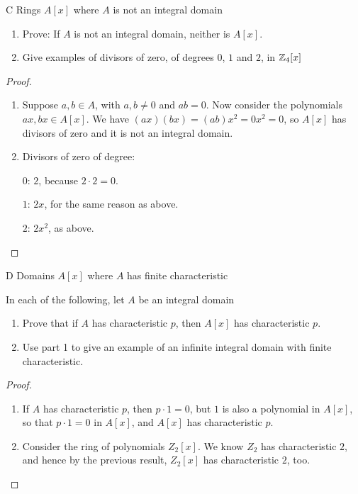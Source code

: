 \begin{exercise}{C Rings $A[x]$ where $A$ is not an integral domain}

\begin{enumerate}
    \item Prove: If $A$ is not an integral domain, neither is $A[x]$.
    \item Give examples of divisors of zero, of degrees $0$, $1$ and $2$, in $\mathbb{Z}_{4}[x]$
\end{enumerate}
\end{exercise}
\begin{proof}
 \begin{enumerate}
     \item Suppose $a,b\in A$, with $a, b\neq0$ and $ab=0$. Now consider the polynomials $ax, bx\in A[x]$. We have $(ax)(bx)=(ab)x^2 = 0x^2 = 0$, so $A[x]$ has divisors of zero and it is not an integral domain.
     \item Divisors of zero of degree:
     
     $0$: $2$, because $2\cdot 2=0$.
     
     $1$: $2x$, for the same reason as above.
     
     $2$: $2x^2$, as above.
 \end{enumerate}
\end{proof}

\begin{exercise}{D Domains $A[x]$ where $A$ has finite characteristic}

In each of the following, let $A$ be an integral domain
\begin{enumerate}
    \item Prove that if $A$ has characteristic $p$, then $A[x]$ has characteristic $p$.
    \item Use part 1 to give an example of an infinite integral domain with finite characteristic.
\end{enumerate}
\end{exercise}
\begin{proof}
 \begin{enumerate}
     \item If $A$ has characteristic $p$, then $p\cdot 1=0$, but $1$ is also a polynomial in $A[x]$, so that $p\cdot 1=0$ in $A[x]$, and $A[x]$ has characteristic $p$.
     \item Consider the ring of polynomials $Z_{2}[x]$. We know $Z_{2}$ has characteristic $2$, and hence by the previous result, $Z_{2}[x]$ has characteristic $2$, too.
 \end{enumerate}
\end{proof}

